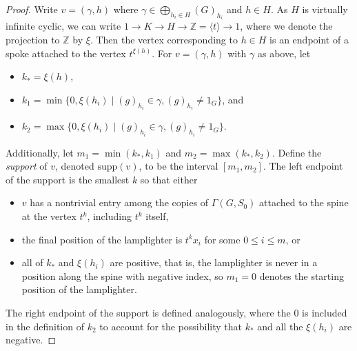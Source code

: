 \documentclass[11pt]{amsart}
\theoremstyle{definition}
\newcommand\Z{\mathbb Z}
\newcommand\support{\mathrm{supp}}
\begin{document}
\begin{proof}
Write $v = (\gamma,h)$ where
$\gamma \in \bigoplus_{h_i \in H} (G)_{h_i}$ and $h\in H$.
As $H$ is virtually infinite cyclic, we can write $1 \rightarrow K \rightarrow H \rightarrow \Z=\langle t \rangle \rightarrow 1$, where we denote the projection to $\Z$ by $\xi$.
Then the vertex corresponding to $h \in H$ is an endpoint of a spoke attached to the vertex $t^{\xi(h)}$.
For $v = (\gamma,h)$ with $\gamma$ as above, let
\begin{itemize}
    \item $k_* = \xi(h)$,
    \item $k_1 = \min\{0,\xi(h_i) \mid  (g)_{h_i} \in \gamma , (g)_{h_i}\neq 1_G\}$, and
    \item $k_2 = \max\{0,\xi(h_i) \mid  (g)_{h_i} \in \gamma, (g)_{h_i}\neq 1_G \}$.
\end{itemize}
Additionally, let $m_1 = \min(k_*,k_1)$ and $m_2 = \max(k_*,k_2)$.
Define the {\em support} of $v$, denoted $\support(v)$,  to be the interval $[m_1,m_2]$.
The left endpoint of the support is the smallest $k$ so that either
\begin{itemize}
    \item $v$ has a nontrivial entry among the copies of $\Gamma(G,S_0)$ attached to the spine at the vertex $t^k$, including $t^k$ itself,
    \item the final position of the lamplighter is $t^kx_i$ for some $0 \leq i \leq m$, or
    \item all of $k_*$ and $\xi(h_i)$ are positive, that is, the lamplighter is never in a position along the spine with negative index, so $m_1=0$ denotes the starting position of the lamplighter.
\end{itemize}
The right endpoint of the support is defined analogously, where the $0$ is included in the definition of $k_2$ to account for the possibility that $k_*$ and all the $\xi(h_i)$ are negative.





\end{proof}
\end{document}
